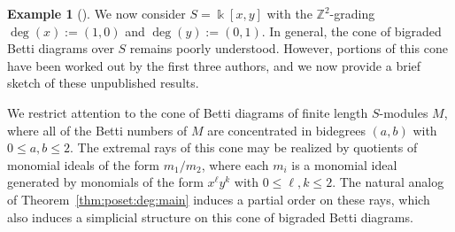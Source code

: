 \documentclass[12pt]{amsart}
\theoremstyle{definition}
\newtheorem{eg}[equation]{Example}
\newenvironment{example}[1][]{\begin{eg}[#1] \pushQED{\qed}}{\popQED \end{eg}}
\newcommand{\ZZ}{\mathbb{Z}}
\begin{document}
\begin{example}\label{ex:bigraded}
  We now consider $S=\Bbbk[x,y]$ with the $\ZZ^2$-grading $\deg(x):=(1,0)$
  and $\deg(y):=(0,1)$.  In general, the cone of bigraded Betti diagrams 
  over $S$ remains poorly understood.  However, 
  portions of this cone have been worked out by the first
  three authors, and we now provide a brief sketch of these unpublished results.

  We restrict attention to the cone of Betti diagrams of finite length
  $S$-modules $M$, where all of the Betti numbers of $M$ are
  concentrated in bidegrees $(a,b)$ with $0\leq a,b\leq 2$.  The
  extremal rays of this cone may be realized by quotients of monomial
  ideals of the form $m_1/m_2$, where each $m_i$ is a monomial ideal
  generated by monomials of the form $x^\ell y^k$ with $0\leq
  \ell,k\leq 2$.  
  The natural analog of Theorem~\ref{thm:poset:deg:main} induces 
  a partial order on these rays, which also induces a simplicial structure 
  on this cone of bigraded Betti diagrams.
\end{example}
\def\cfudot#1{\ifmmode\setbox7\hbox{$\accent"5E#1$}\else
  \setbox7\hbox{\accent"5E#1}\penalty 10000\relax\fi\raise 1\ht7
  \hbox{\raise.1ex\hbox to 1\wd7{\hss.\hss}}\penalty 10000 \hskip-1\wd7\penalty
  10000\box7}
\end{document}
